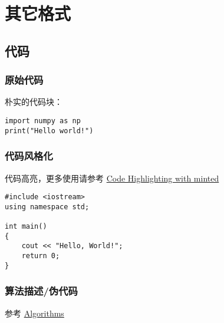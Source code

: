 
\chapter{其它格式}
\section{代码}
\subsection{原始代码}
朴实的代码块：

\begin{verbatim}
import numpy as np
print("Hello world!")
\end{verbatim}

\subsection{代码风格化}
代码高亮，更多使用请参考 \href{https://www.overleaf.com/learn/latex/Code_Highlighting_with_minted}{Code Highlighting with minted}

\begin{verbatim}
#include <iostream>
using namespace std;

int main() 
{
    cout << "Hello, World!";
    return 0;
}
\end{verbatim}

\subsection{算法描述/伪代码}
参考 \href{https://en.wikibooks.org/wiki/LaTeX/Algorithms}{Algorithms}



